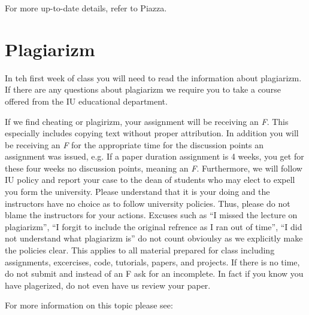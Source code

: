 

For more up-to-date details, refer to Piazza.

\section{Plagiarizm}

In teh first week of class you will need to read the information about
plagiarizm. If there are any questions about plagiarizm we require you
to take a course offered from the IU educational department.

\begin{WARNING}
  If we find cheating or plagirizm, your assignment will be receiving
  an {\em F}. This especially includes copying text without proper
  attribution. In addition you will be receiving an {\em F} for the
  appropriate time for the discussion points an assignment was issued,
  e.g. If a paper duration assignment is 4 weeks, you get for these
  four weeks no discussion points, meaning an {\em F}. Furthermore, we
  will follow IU policy and report your case to the dean of students
  who may elect to expell you form the university. Please understand
  that it is your doing and the instructors have no choice as to
  follow university policies. Thus, please do not blame the
  instructors for your actions. Excuses such as ``I missed the lecture
  on plagiarizm'', ``I forgit to include the original refrence as I
  ran out of time'', ``I did not understand what plagiarizm is'' do
  not count obvioulsy as we explicitly make the policies clear. This
  applies to all material prepared for class including assignments,
  excercises, code, tutorials, papers, and projects. If there is no
  time, do not submit and instead of an F ask for an incomplete. In
  fact if you know you have plagerized, do not even have us review
  your paper. 
\end{WARNING}

For more information on this topic please see:


